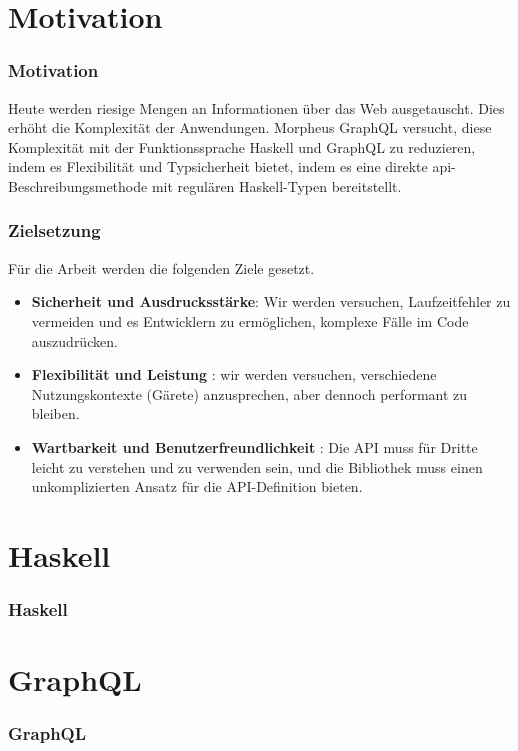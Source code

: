 
\section{Motivation}

\begin{frame}{}
    \frametitle{Motivation}

    Heute werden riesige Mengen an Informationen über das Web ausgetauscht. Dies erhöht die Komplexität der Anwendungen. Morpheus GraphQL versucht, diese Komplexität mit der Funktionssprache Haskell und GraphQL zu reduzieren, indem es Flexibilität und Typsicherheit bietet, indem es eine direkte api-Beschreibungsmethode mit regulären Haskell-Typen bereitstellt. 

\end{frame}

\begin{frame}
    \frametitle{Zielsetzung}

    Für die Arbeit werden die folgenden Ziele gesetzt.    

    \begin{itemize}

        \item \textbf{Sicherheit und Ausdrucksstärke}: Wir werden versuchen, Laufzeitfehler zu vermeiden und es Entwicklern zu ermöglichen, komplexe Fälle im Code auszudrücken.
        
        \item \textbf{Flexibilität und Leistung} : wir werden  versuchen, verschiedene Nutzungskontexte (Gärete) anzusprechen, aber dennoch performant zu bleiben. 
        
        \item \textbf{Wartbarkeit und Benutzerfreundlichkeit}
       :  Die API muss für Dritte leicht zu verstehen und zu verwenden sein, und die Bibliothek muss einen unkomplizierten Ansatz für die API-Definition bieten. 

    \end{itemize}   
\end{frame}

\section{Haskell}

\begin{frame}{}
    \frametitle{Haskell}
\end{frame}


\section{GraphQL}
\begin{frame}{}
    \frametitle{GraphQL}
\end{frame}


